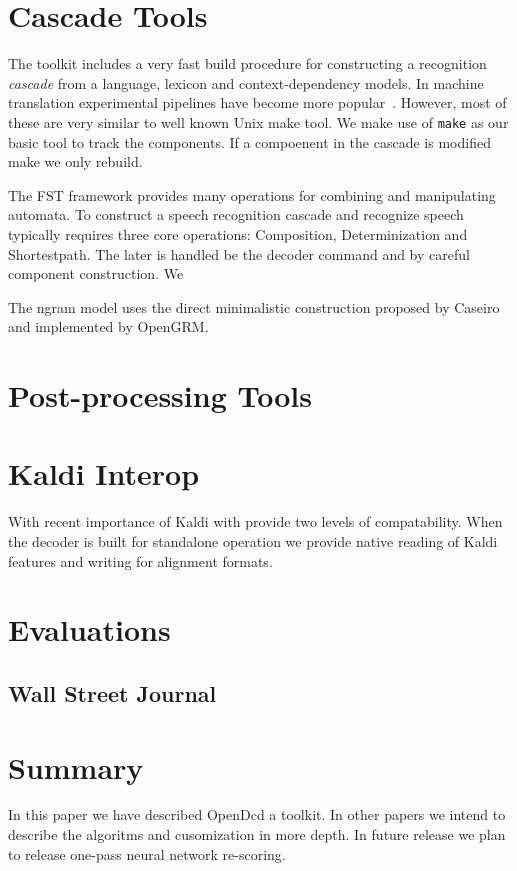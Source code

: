 \documentclass{article}
\begin{document}
\section{Cascade Tools}
\label{sec:cascade}
The toolkit includes a very fast build procedure for constructing a recognition
\emph{cascade} from a language, lexicon and context-dependency models. In 
machine translation experimental pipelines have become more popular~\cite{koehn10}. 
However, most of these are very similar to well known Unix make tool. We make 
use of \texttt{make} as our basic tool to track the components. 
If a compoenent in the cascade is modified make we only rebuild.

The FST framework provides many operations for combining and manipulating
automata. To construct a speech recognition cascade and recognize speech 
typically requires three core operations: Composition, Determinization and
Shortestpath. The later is handled be the decoder command and by careful
component construction. We 

The ngram model uses the direct minimalistic construction proposed by
Caseiro~\cite{caseiro01} and implemented by OpenGRM.

\section{Post-processing Tools}
\label{sec:postprocess}

\section{Kaldi Interop}
With recent importance of Kaldi with provide two levels of compatability.
When the decoder is built for standalone operation we provide native reading
of Kaldi features and writing for alignment formats.


\section{Evaluations}
\label{sec:majhead}

\subsection{Wall Street Journal}

\section{Summary}
\label{sec:page}
In this paper we have described OpenDcd a toolkit. In other papers we intend to
describe the algoritms and cusomization in more depth. In future release we
plan to release one-pass neural network re-scoring.



\end{document}
